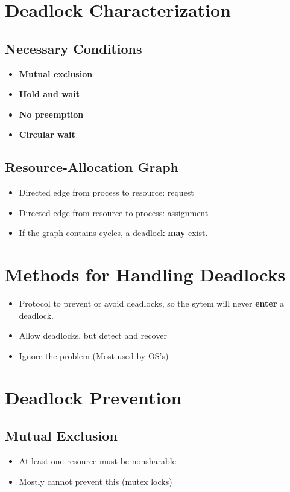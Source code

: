 \documentclass[10pt]{report}
\begin{document}
	\section{Deadlock Characterization}
		\subsection{Necessary Conditions}
			\begin{itemize}
				\item \textbf{Mutual exclusion}
				\item \textbf{Hold and wait}
				\item \textbf{No preemption}
				\item \textbf{Circular wait}
			\end{itemize}

		\subsection{Resource-Allocation Graph}
			\begin{itemize}
				\item Directed edge from process to resource: request
				\item Directed edge from resource to process: assignment
				\item If the graph contains cycles, a deadlock \textbf{may} exist.
			\end{itemize}

	\section{Methods for Handling Deadlocks}
		\begin{itemize}
			\item Protocol to prevent or avoid deadlocks, so the sytem will never \textbf{enter} a deadlock.
			\item Allow deadlocks, but detect and recover
			\item Ignore the problem (Most used by OS's)
		\end{itemize}

	\section{Deadlock Prevention}
		\subsection{Mutual Exclusion}
			\begin{itemize}
				\item At least one resource must be nonsharable
				\item Mostly cannot prevent this (mutex locks)
			\end{itemize}
\end{document}
